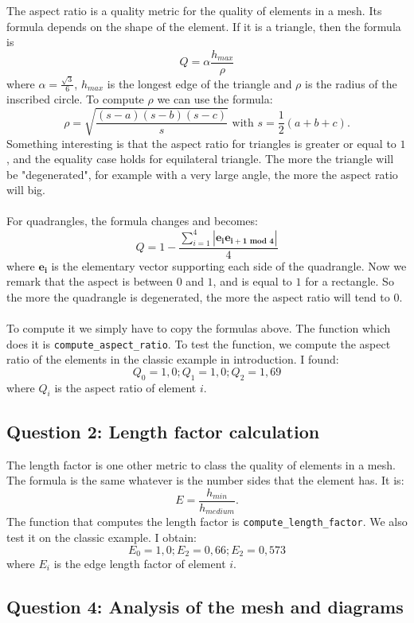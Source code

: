 \documentclass[a4paper]{article}
\begin{document}
\hspace{0.8cm} The aspect ratio is a quality metric for the quality of elements in a mesh. Its formula depends on the shape of the element. If it is a triangle, then the formula is $$\displaystyle Q = \alpha \frac{h_{max}}{\rho}$$ where $\alpha = \displaystyle \frac{\sqrt{3}}{6}$, $h_{max}$ is the longest edge of the triangle and $\rho$ is the radius of the inscribed circle. To compute $\rho$ we can use the formula: $$\displaystyle \rho = \sqrt{\frac{(s-a)(s-b)(s-c)}{s}} \text{ with } s= \frac{1}{2}(a + b+ c).$$ 
Something interesting is that the aspect ratio for triangles is greater or equal to $1$, and the equality case holds for equilateral triangle. The more the triangle will be "degenerated", for example with a very large angle, the more the aspect ratio will big.\\ \\
For quadrangles, the formula changes and becomes: $$\displaystyle Q = 1 - \frac{\displaystyle \sum_{i=1}^{4} |\bm{e_i} \bm{e_{i+1 \text{ mod 4}}}|}{4}$$ where $\bm{e_i}$ is the elementary vector supporting each side of the quadrangle. Now we remark that the aspect is between $0$ and $1$, and is equal to $1$ for a rectangle. So the more the quadrangle is degenerated, the more the aspect ratio will tend to $0$.\\ \\
To compute it we simply have to copy the formulas above. The function which does it is \texttt{compute\_aspect\_ratio}. To test the function, we compute the aspect ratio of the elements in the classic example in introduction. I found: $$Q_0 = 1,0; Q_1 =1,0; Q_2 = 1,69$$ where $Q_i$ is the aspect ratio of element $i$.

\subsection{Question 2: Length factor calculation}

\hspace{0.8cm} The length factor is one other metric to class the quality of elements in a mesh. The formula is the same whatever is the number sides that the element has. It is: $$\displaystyle E = \frac{h_{min}}{h_{medium}}.$$
The function that computes the length factor is \texttt{compute\_length\_factor}. We also test it on the classic example. I obtain: $$E_0 = 1,0 ; E_2 = 0,66 ; E_2 = 0,573$$ where $E_i$ is the edge length factor of element $i$.

\subsection{Question 4: Analysis of the mesh and diagrams}
\end{document}

